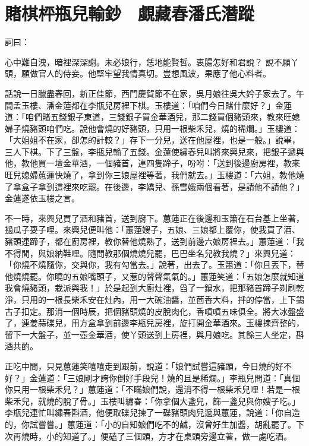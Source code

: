 %

\chapter{賭棋枰瓶兒輸鈔　覷藏春潘氏潛蹤}

詞曰：

心中難自洩，暗裡深深謝。未必娘行，恁地能賢哲。衷腸怎好和君說？
說不願丫頭，願做官人的侍妾。他堅牢望我情真切。豈想風波，果應了他心料者。

話說一日臘盡春回，新正佳節，西門慶賀節不在家，吳月娘往吳大妗子家去了。午間孟玉樓、潘金蓮都在李瓶兒房裡下棋。玉樓道：「咱們今日賭什麼好？」金蓮道：「咱們賭五錢銀子東道，三錢銀子買金華酒兒，那二錢買個豬頭來，教來旺媳婦子燒豬頭咱們吃。說他會燒的好豬頭，只用一根柴禾兒，燒的稀爛。」玉樓道： 「大姐姐不在家，卻怎的計較？」存下一分兒，送在他屋裡，也是一般。」說畢，三人下棋。下了三盤，李瓶兒輸了五錢。金蓮使繡春兒叫將來興兒來，把銀子遞與他，教他買一壇金華酒，一個豬首，連四隻蹄子，吩咐：「送到後邊廚房裡，教來旺兒媳婦蕙蓮快燒了，拿到你三娘屋裡等著，我們就去。」玉樓道：「六姐，教他燒了拿盒子拿到這裡來吃罷。在後邊，李嬌兒、孫雪娥兩個看著，是請他不請他？」金蓮遂依玉樓之言。

不一時，來興兒買了酒和豬首，送到廚下。蕙蓮正在後邊和玉簫在石台基上坐著，撾瓜子耍子哩。來興兒便叫他：「蕙蓮嫂子，五娘、三娘都上覆你，使我買了酒、豬頭連蹄子，都在廚房裡，教你替他燒熟了，送到前邊六娘房裡去。」蕙蓮道：「我不得閒，與娘納鞋哩。隨問教那個燒燒兒罷，巴巴坐名兒教我燒？」來興兒道： 「你燒不燒隨你，交與你，我有勾當去。」說著，出去了。玉簫道：「你且丟下，替他燒燒罷。你曉的五娘嘴頭子，又惹的聲聲氣氣的。」蕙蓮笑道：「五娘怎麼就知道我會燒豬頭，栽派與我！」於是起到大廚灶裡，舀了一鍋水，把那豬首蹄子剃刷乾淨，只用的一根長柴禾安在灶內，用一大碗油醬，並茴香大料，拌的停當，上下錫古子扣定。那消一個時辰，把個豬頭燒的皮脫肉化，香噴噴五味俱全。將大冰盤盛了，連姜蒜碟兒，用方盒拿到前邊李瓶兒房裡，旋打開金華酒來。玉樓揀齊整的，留下一大盤子，並一壺金華酒，使丫頭送到上房裡，與月娘吃。其餘三人坐定，斟酒共酌。

正吃中間，只見蕙蓮笑嘻嘻走到跟前，說道：「娘們試嘗這豬頭，今日燒的好不好？」金蓮道：「三娘剛才誇你倒好手段兒！燒的且是稀爛。」李瓶兒問道：「真個你只用一根柴禾兒？」蕙蓮道：「不瞞娘們說，還消不得一根柴禾兒哩！若是一根柴禾兒，就燒的脫了骨。」玉樓叫繡春：「你拿個大盞兒，篩一盞兒與你嫂子吃。」李瓶兒連忙叫繡春斟酒，他便取碟兒揀了一碟豬頭肉兒遞與蕙蓮，說道：「你自造的，你試嘗嘗。」蕙蓮道：「小的自知娘們吃不的鹹，沒曾好生加醬，胡亂罷了。下次再燒時，小的知道了。」便磕了三個頭，方才在桌頭旁邊立著，做一處吃酒。

